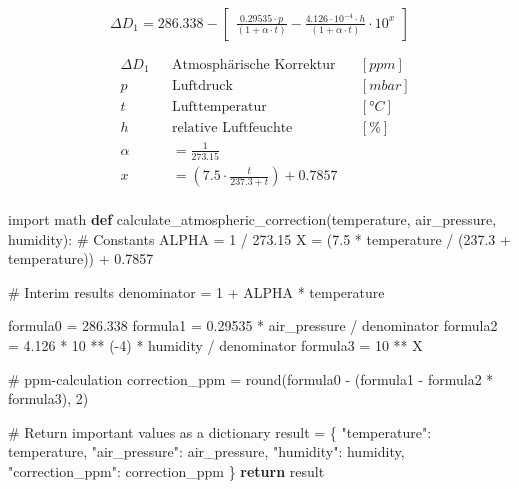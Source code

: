 \documentclass[
  11pt,
  a4paper,
  oneside, openany  ,captions=tableheading
]{scrbook}
\newenvironment{Shaded}{\begin{snugshade}}{\end{snugshade}}
\newcommand{\BuiltInTok}[1]{\textcolor[rgb]{0.00,0.23,0.31}{#1}}
\newcommand{\CommentTok}[1]{\textcolor[rgb]{0.37,0.37,0.37}{#1}}
\newcommand{\ControlFlowTok}[1]{\textcolor[rgb]{0.00,0.23,0.31}{\textbf{#1}}}
\newcommand{\DecValTok}[1]{\textcolor[rgb]{0.68,0.00,0.00}{#1}}
\newcommand{\FloatTok}[1]{\textcolor[rgb]{0.68,0.00,0.00}{#1}}
\newcommand{\ImportTok}[1]{\textcolor[rgb]{0.00,0.46,0.62}{#1}}
\newcommand{\KeywordTok}[1]{\textcolor[rgb]{0.00,0.23,0.31}{\textbf{#1}}}
\newcommand{\NormalTok}[1]{\textcolor[rgb]{0.00,0.23,0.31}{#1}}
\newcommand{\OperatorTok}[1]{\textcolor[rgb]{0.37,0.37,0.37}{#1}}
\newcommand{\StringTok}[1]{\textcolor[rgb]{0.13,0.47,0.30}{#1}}
\theoremstyle{remark}
\begin{document}
\[\Delta D_1 = 286.338 - \begin{bmatrix}\frac{0.29535 \cdot p}{(1+\alpha \cdot t)}-\frac{4.126 \cdot 10^{-4} \cdot h}{(1+\alpha \cdot t)} \cdot 10^x\end{bmatrix}\]

\[\begin{aligned}
& \Delta D_1 && \text{Atmosphärische Korrektur} && [ppm]\\
& p && \text{Luftdruck} && [mbar]\\
& t && \text{Lufttemperatur} && [°C]\\
& h && \text{relative Luftfeuchte} && [\%]\\
& \alpha && = \frac{1}{273.15} \\
& x && = (7.5 \cdot \frac{t}{237.3 +t}) + 0.7857 \\
\end{aligned}
\]

\begin{Shaded}
\begin{Highlighting}[]
\ImportTok{import}\NormalTok{ math}
\KeywordTok{def}\NormalTok{ calculate\_atmospheric\_correction(temperature, air\_pressure, humidity):}
    \CommentTok{\# Constants}
\NormalTok{    ALPHA }\OperatorTok{=} \DecValTok{1} \OperatorTok{/} \FloatTok{273.15}
\NormalTok{    X }\OperatorTok{=}\NormalTok{ (}\FloatTok{7.5} \OperatorTok{*}\NormalTok{ temperature }\OperatorTok{/}\NormalTok{ (}\FloatTok{237.3} \OperatorTok{+}\NormalTok{ temperature)) }\OperatorTok{+} \FloatTok{0.7857}

    \CommentTok{\# Interim results}
\NormalTok{    denominator }\OperatorTok{=} \DecValTok{1} \OperatorTok{+}\NormalTok{ ALPHA }\OperatorTok{*}\NormalTok{ temperature}

\NormalTok{    formula0 }\OperatorTok{=} \FloatTok{286.338}
\NormalTok{    formula1 }\OperatorTok{=} \FloatTok{0.29535} \OperatorTok{*}\NormalTok{ air\_pressure }\OperatorTok{/}\NormalTok{ denominator}
\NormalTok{    formula2 }\OperatorTok{=} \FloatTok{4.126} \OperatorTok{*} \DecValTok{10} \OperatorTok{**}\NormalTok{ (}\OperatorTok{{-}}\DecValTok{4}\NormalTok{) }\OperatorTok{*}\NormalTok{ humidity }\OperatorTok{/}\NormalTok{ denominator}
\NormalTok{    formula3 }\OperatorTok{=} \DecValTok{10} \OperatorTok{**}\NormalTok{ X}

    \CommentTok{\# ppm{-}calculation}
\NormalTok{    correction\_ppm }\OperatorTok{=} \BuiltInTok{round}\NormalTok{(formula0 }\OperatorTok{{-}}\NormalTok{ (formula1 }\OperatorTok{{-}}\NormalTok{ formula2 }\OperatorTok{*}\NormalTok{ formula3), }\DecValTok{2}\NormalTok{)}

    \CommentTok{\# Return important values as a dictionary}
\NormalTok{    result }\OperatorTok{=}\NormalTok{ \{}
        \StringTok{"temperature"}\NormalTok{: temperature,}
        \StringTok{"air\_pressure"}\NormalTok{: air\_pressure,}
        \StringTok{"humidity"}\NormalTok{: humidity,}
        \StringTok{"correction\_ppm"}\NormalTok{: correction\_ppm}
\NormalTok{    \}}
    \ControlFlowTok{return}\NormalTok{ result}
\end{Highlighting}
\end{Shaded}
\end{document}
